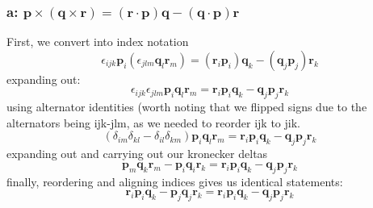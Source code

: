 \subsubsection*{a: $\bm{p} \times (\bm{q} \times \bm{r}) = (\bm{r} \cdot \bm{p}) \bm{q} - (\bm{q} \cdot \bm{p}) \bm{r}$}
First, we convert into index notation
\begin{equation}
    \epsilon_{ijk}\bm{p}_{i}(\epsilon_{jlm}\bm{q}_{l}\bm{r}_{m}) = (\bm{r}_i\bm{p}_i) \bm{q}_k - (\bm{q}_j\bm{p}_j) \bm{r}_k
\end{equation}
expanding out: 
\begin{equation}
    \epsilon_{ijk}\epsilon_{jlm}\bm{p}_{i}\bm{q}_{l}\bm{r}_{m} = \bm{r}_i\bm{p}_i \bm{q}_k - \bm{q}_j\bm{p}_j \bm{r}_k
\end{equation}
using alternator identities (worth noting that we flipped signs due to the alternators being ijk-jlm, as we needed to reorder ijk to jik.
\begin{equation}
    (\delta_{im}\delta_{kl}-\delta_{il}\delta_{km})\bm{p}_{i}\bm{q}_{l}\bm{r}_{m} = \bm{r}_i\bm{p}_i \bm{q}_k - \bm{q}_j\bm{p}_j \bm{r}_k
\end{equation}
expanding out and carrying out our kronecker deltas 
\begin{equation}
    \bm{p}_{m}\bm{q}_{k}\bm{r}_{m}-\bm{p}_{i}\bm{q}_{i}\bm{r}_{k} = \bm{r}_i\bm{p}_i \bm{q}_k - \bm{q}_j\bm{p}_j \bm{r}_k
\end{equation}
finally, reordering and aligning indices gives us identical statements:
\begin{equation}
    \boxed{\bm{r}_{i}\bm{p}_{i}\bm{q}_{k}-\bm{p}_{j}\bm{q}_{j}\bm{r}_{k} = \bm{r}_i\bm{p}_i \bm{q}_k - \bm{q}_j\bm{p}_j \bm{r}_k}
\end{equation}



